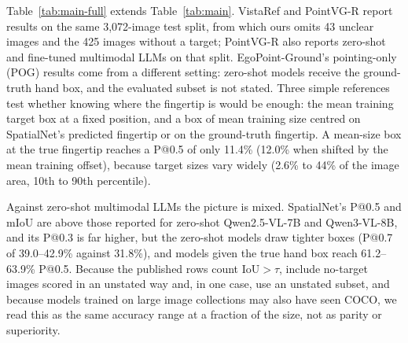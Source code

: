 Table~\ref{tab:main-full} extends Table~\ref{tab:main}. VistaRef and PointVG-R report results on the same 3,072-image test split, from which ours omits 43 unclear images and the 425 images without a target; PointVG-R also reports zero-shot and fine-tuned multimodal LLMs on that split. EgoPoint-Ground's pointing-only (POG) results come from a different setting: zero-shot models receive the ground-truth hand box, and the evaluated subset is not stated. Three simple references test whether knowing where the fingertip is would be enough: the mean training target box at a fixed position, and a box of mean training size centred on SpatialNet's predicted fingertip or on the ground-truth fingertip. A mean-size box at the true fingertip reaches a P@0.5 of only 11.4\% (12.0\% when shifted by the mean training offset), because target sizes vary widely (2.6\% to 44\% of the image area, 10th to 90th percentile).

Against zero-shot multimodal LLMs the picture is mixed. SpatialNet's P@0.5 and mIoU are above those reported for zero-shot Qwen2.5-VL-7B and Qwen3-VL-8B, and its P@0.3 is far higher, but the zero-shot models draw tighter boxes (P@0.7 of 39.0--42.9\% against 31.8\%), and models given the true hand box reach 61.2--63.9\% P@0.5. Because the published rows count IoU${>}\tau$, include no-target images scored in an unstated way and, in one case, use an unstated subset, and because models trained on large image collections may also have seen COCO, we read this as the same accuracy range at a fraction of the size, not as parity or superiority.

